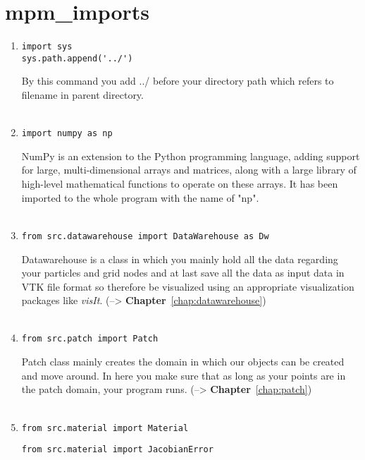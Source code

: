 \documentclass[11pt,fleqn]{book} %
\begin{document}
\chapter{mpm\_imports}
\begin{enumerate}
\item 
\begin{lstlisting}
import sys
sys.path.append('../')
\end{lstlisting}
By this command you add ../ before your directory path which refers to filename in parent directory.\\ \\
\item 
\begin{lstlisting}
import numpy as np
\end{lstlisting}
NumPy is an extension to the Python programming language, adding support for large, multi-dimensional arrays and matrices, along with a large library of high-level mathematical functions to operate on these arrays. It has been imported to the whole program with the name of "np".\\ \\
\item 
\begin{lstlisting}
from src.datawarehouse import DataWarehouse as Dw
\end{lstlisting}
Datawarehouse is a class in which you mainly hold all the data regarding your particles and grid nodes and at last save all the data as input data in VTK file format so therefore be visualized using an appropriate visualization packages like \emph{visIt}. (--> \textbf{Chapter}~\ref{chap:datawarehouse})\\ \\
\item 
\begin{lstlisting}
from src.patch import Patch
\end{lstlisting}
Patch class mainly creates the domain in which our objects can be created and move around. In here you make sure that as long as your points are in the patch domain, your program runs. (--> \textbf{Chapter}~\ref{chap:patch})\\ \\
\item 
\begin{lstlisting}
from src.material import Material
\end{lstlisting}
\begin{lstlisting}
from src.material import JacobianError
\end{lstlisting}


\end{enumerate}
\end{document}

